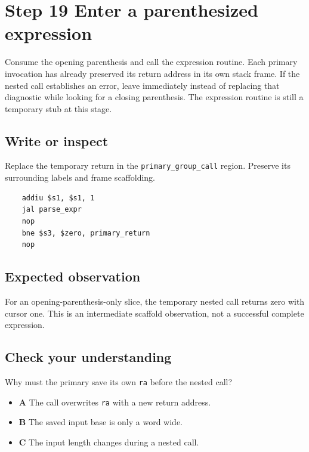 \section{Step 19 Enter a parenthesized expression}\label{expression-s19}

Consume the opening parenthesis and call the expression routine. Each primary invocation has already preserved its return address in its own stack frame. If the nested call establishes an error, leave immediately instead of replacing that diagnostic while looking for a closing parenthesis. The expression routine is still a temporary stub at this stage.

\subsection{Write or inspect}
Replace the temporary return in the \texttt{primary\_group\_call} region. Preserve its surrounding labels and frame scaffolding.

\begin{verbatim}
    addiu $s1, $s1, 1
    jal parse_expr
    nop
    bne $s3, $zero, primary_return
    nop
\end{verbatim}
\subsection{Expected observation}
For an opening-parenthesis-only slice, the temporary nested call returns zero with cursor one. This is an intermediate scaffold observation, not a successful complete expression.

\subsection{Check your understanding}
Why must the primary save its own \texttt{ra} before the nested call?

\begin{itemize}
  \item \textbf{A} The call overwrites \texttt{ra} with a new return address.
  \item \textbf{B} The saved input base is only a word wide.
  \item \textbf{C} The input length changes during a nested call.
\end{itemize}
